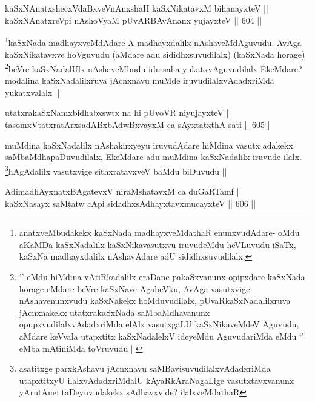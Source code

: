 
\begin{shl}
kaSxNAnatxshecxVdaBxveVnAnxshaH kaSxNikatavxM bihanayxteV || \\
kaSxNAnatxreV\s pi nAshoV\s yaM pUvARBAvAnanx yujayxteV ||  604 ||  
\end{shl}

\begin{artha}
\footnote{anatxveMbudakekx kaSxNada madhayxveMdathaR enunxvudAdare- oMdu aKaMDa kaSxNadalilx kaSxNikavasutxvu iruvudeMdu heVLuvudu iSaTx, kaSxNa madhayxdalilx nAshavAdare adU sididhxsuvudilalx.}kaSxNada madhayxveMdAdare A madhayxdalilx nAshaveMdAguvudu. AvAga kaSxNikatavxve hoVguvudu (aMdare adu sididhxsuvudilalx) (kaSxNada horage) \footnote{`\stext' eMdu hiMdina vAtiRkadalilx eraDane pakaSxvanunx opipxdare kaSxNada horage eMdare beVre kaSxNave AgabeVku, AvAga vasutxvige nAshavenunxvudu kaSxNakekx hoMduvudilalx, pUvaRkaSxNadalilxruva jAcnxnakekx utatxrakaSxNada saMbaMdhavanunx opupxvudilalxvAdadxriMda elAlx vasutxgaLU kaSxNikaveMdeV Aguvudu, aMdare keVvala utapxtitx kaSxNadalelxV ideyeMdu AguvudariMda eMdu `\stext' eMba mAtiniMda toVruvudu ||}beVre kaSxNadalUlx nAshaveMbudu idu saha yukatxvAguvudilalx EkeMdare? modalina kaSxNadalilxruva jAcnxnavu muMde iruvudilalxvAdadxriMda yukatxvalalx ||
\end{artha}


\begin{shl}
utatxrakaSxNamxbidhabxswtx na hi pUvoVR niyujayxteV || \\
tasomxVtatxratArxsadABxbAdwBxvayxM ca sAyxtatxthA sati ||  605 ||  
\end{shl}

\begin{artha}
muMdina kaSxNadalilx nAshakirxyeyu iruvudAdare hiMdina vasutx adakekx saMbaMdhapaDuvudilalx, EkeMdare adu muMdina kaSxNadalilx iruvude ilalx. \footnote{asatitxge parxkAshavu jAcnxnavu saMBavisuvudilalxvAdadxriMda utapxtitxyU ilalxvAdadxriMdalU kAyaRkAraNagaLige vasutxtavxvanunx yArutAne; taDeyuvudakekx sAdhayxvide? ilalxveMdathaR}hAgAdalilx vasutxvige sithxratavxveV baMdu biDuvudu ||
\end{artha}

\begin{shl}
AdimadhAyxnatxBAgatevxV niraMshatavxM ca duGaRTamf || \\
kaSxNasayx saMtatw cApi sidadhxsAdhayxtavxmucayxteV ||  606 ||  
\end{shl}

